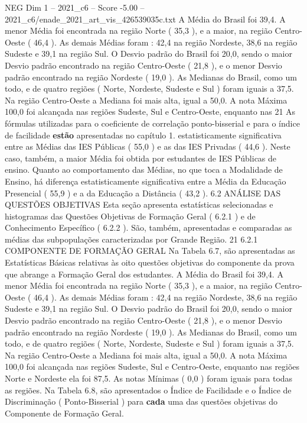 \begin{textsample}{NEG Dim 1 – 2021\_c6 – Score -5.00 – 2021\_c6/enade\_2021\_art\_vis\_426539035c.txt}
A Média do Brasil foi 39,4.
A menor Média foi encontrada na região Norte ( 35,3 ), e a maior, na região Centro-Oeste ( 46,4 ).
As demais Médias foram : 42,4 na região Nordeste, 38,6 na região Sudeste e 39,1 na região Sul.
O Desvio padrão do Brasil foi 20,0, sendo o maior Desvio padrão encontrado na região Centro-Oeste ( 21,8 ), e o menor Desvio padrão encontrado na região Nordeste ( 19,0 ).
As Medianas do Brasil, como um todo, e de quatro regiões ( Norte, Nordeste, Sudeste e Sul ) foram iguais a 37,5.
Na região Centro-Oeste a Mediana foi mais alta, igual a 50,0.
A nota Máxima 100,0 foi alcançada nas regiões Sudeste, Sul e Centro-Oeste, enquanto nas 21 As fórmulas utilizadas para o coeficiente de correlação ponto-bisserial e para o índice de facilidade \textbf{estão} apresentadas no capítulo 1. estatisticamente significativa entre as Médias das IES Públicas ( 55,0 ) e as das IES Privadas ( 44,6 ).
Neste caso, também, a maior Média foi obtida por estudantes de IES Públicas de ensino.
Quanto ao comportamento das Médias, no que toca a Modalidade de Ensino, há diferença estatisticamente significativa entre a Média da Educação Presencial ( 55,9 ) e a da Educação a Distância ( 43,2 ). 6.2 ANÁLISE DAS QUESTÕES OBJETIVAS Esta seção apresenta estatísticas selecionadas e histogramas das Questões Objetivas de Formação Geral ( 6.2.1 ) e de Conhecimento Específico ( 6.2.2 ).
São, também, apresentadas e comparadas as médias das subpopulações caracterizadas por Grande Região. 21 6.2.1 COMPONENTE DE FORMAÇÃO GERAL Na Tabela 6.7, são apresentadas as Estatísticas Básicas relativas às oito questões objetivas do componente da prova que abrange a Formação Geral dos estudantes.
A Média do Brasil foi 39,4.
A menor Média foi encontrada na região Norte ( 35,3 ), e a maior, na região Centro-Oeste ( 46,4 ).
As demais Médias foram : 42,4 na região Nordeste, 38,6 na região Sudeste e 39,1 na região Sul.
O Desvio padrão do Brasil foi 20,0, sendo o maior Desvio padrão encontrado na região Centro-Oeste ( 21,8 ), e o menor Desvio padrão encontrado na região Nordeste ( 19,0 ).
As Medianas do Brasil, como um todo, e de quatro regiões ( Norte, Nordeste, Sudeste e Sul ) foram iguais a 37,5.
Na região Centro-Oeste a Mediana foi mais alta, igual a 50,0.
A nota Máxima 100,0 foi alcançada nas regiões Sudeste, Sul e Centro-Oeste, enquanto nas regiões Norte e Nordeste ela foi 87,5.
As notas Mínimas ( 0,0 ) foram iguais para todas as regiões.
Na Tabela 6.8, são apresentados o Índice de Facilidade e o Índice de Discriminação ( Ponto-Bisserial ) para \textbf{cada} uma das questões objetivas do Componente de Formação Geral.

\end{textsample}
